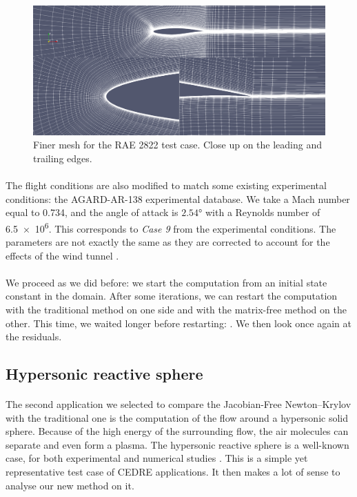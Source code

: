         \begin{figure}
          \centering
          \includegraphics[width=\textwidth]{figures/rae_mesh_fine.png}
          \caption{Finer mesh for the RAE 2822 test case. Close up on the leading and trailing edges.}
          \label{fig:rae_mesh_fine}
        \end{figure}

        \paragraph{}
        The flight conditions are also modified to match some existing experimental conditions: the AGARD-AR-138 experimental database.
        We take a Mach number equal to 0.734, and the angle of attack is $2.54\si{\degree}$ with a Reynolds number of \num{6.5e6}.
        This corresponds to \emph{Case 9} from the experimental conditions.
        The parameters are not exactly the same as they are corrected to account for the effects of the wind tunnel \cite{HellstromDavidsonRizzi1994}.

        \paragraph{}
        We proceed as we did before: we start the computation from an initial state constant in the domain.
        After some iterations, we can restart the computation with the traditional method on one side and with the matrix-free method on the other.
        This time, we waited longer before restarting: .
        We then look once again at the residuals.


    \subsection{Hypersonic reactive sphere}

      \paragraph{}
      The second application we selected to compare the Jacobian-Free Newton--Krylov with the traditional one is the computation of the flow around a hypersonic solid sphere.
      Because of the high energy of the surrounding flow, the air molecules can separate and even form a plasma.
      The hypersonic reactive sphere is a well-known case, for both experimental \cite{Lobb1964} and numerical studies \cite{DobrovGimadievKarpenkoEtAl2022}.
      This is a simple yet representative test case of CEDRE applications.
      It then makes a lot of sense to analyse our new method on it.

